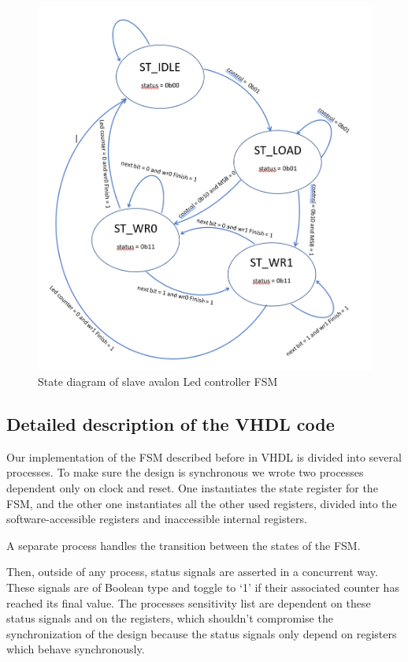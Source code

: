 \documentclass{article}
\begin{document}
\begin{figure}[H]
    \centering
    \includegraphics[width=\textwidth]{FSM}
    \caption{State diagram of slave avalon Led controller FSM}
    \label{fig:FSM}
\end{figure}


\subsection{Detailed description of the VHDL code}
Our implementation of the FSM described before in VHDL is divided into several processes. To make sure the design is synchronous we wrote two processes dependent only on clock and reset. One instantiates the state register for the FSM, and the other one instantiates all the other used registers, divided into the software-accessible registers and inaccessible internal registers.

A separate process handles the transition between the states of the FSM.

Then, outside of any process, status signals are asserted in a concurrent way. These signals are of Boolean type and toggle to ‘1’ if their associated counter has reached its final value. The processes sensitivity list are dependent on these status signals and on the registers, which shouldn't compromise the synchronization of the design because the status signals only depend on registers which behave synchronously.
\end{document}
